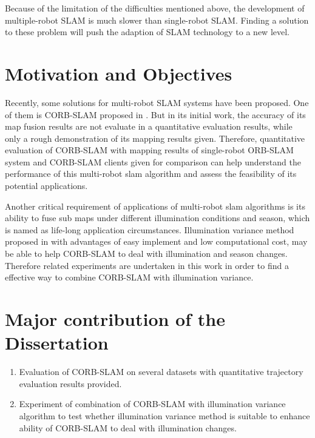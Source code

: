 Because of the limitation of the difficulties mentioned above, the development of multiple-robot SLAM is much slower than single-robot SLAM. Finding a solution to these problem will push the adaption of SLAM technology to a new level.

\section{Motivation and Objectives}

Recently, some solutions for multi-robot SLAM systems have been proposed. One of them is CORB-SLAM proposed in \cite{li2017corb}. But in its initial work, the accuracy of its map fusion results are not evaluate in a quantitative evaluation results, while only a rough demonstration of its mapping results given. Therefore, quantitative evaluation of CORB-SLAM with mapping results of single-robot ORB-SLAM system and CORB-SLAM clients given for comparison can help understand the performance of this multi-robot slam algorithm and assess the feasibility of its potential applications.

Another critical requirement of applications of multi-robot slam algorithms is its ability to fuse sub maps under different illumination conditions and season, which is named as life-long application circumstances. Illumination variance method proposed in \cite{maddern2014illumination}  with advantages of easy implement and low computational cost, may be able to help CORB-SLAM to deal with illumination and season changes. Therefore related experiments are undertaken in this work in order to find a effective way to combine CORB-SLAM with illumination variance.

\section{Major contribution of the Dissertation}
\begin{enumerate}[1.]
	\item Evaluation of CORB-SLAM on several datasets with quantitative trajectory evaluation results provided.
	\item Experiment of combination of CORB-SLAM with illumination variance algorithm to test whether illumination variance method is suitable to enhance ability of CORB-SLAM to deal with illumination changes.
\end{enumerate}

